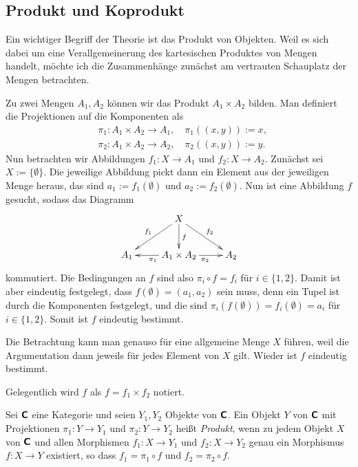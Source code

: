 \subsection{Produkt und Koprodukt}

Ein wichtiger Begriff der Theorie ist das Produkt von
Objekten. Weil es sich dabei um eine Verallgemeinerung des
kartesischen Produktes von Mengen handelt, möchte ich die
Zusammenhänge zunächst am vertrauten Schauplatz der Mengen
betrachten.

Zu zwei Mengen $A_1, A_2$ können wir das Produkt
$A_1\times A_2$ bilden. Man definiert die Projektionen
auf die Komponenten als
\begin{align*}
&\pi_1\colon A_1\times A_2\to A_1,\quad\pi_1((x,y)) := x,\\
&\pi_2\colon A_1\times A_2\to A_2,\quad\pi_2((x,y)) := y.
\end{align*}
Nun betrachten wir Abbildungen $f_1\colon X\to A_1$ und
$f_2\colon X\to A_2$. Zunächst sei $X:=\{\emptyset\}$. Die jeweilige
Abbildung pickt dann ein Element aus der jeweiligen Menge heraus,
das sind $a_1:=f_1(\emptyset)$ und $a_2:=f_2(\emptyset)$. Nun
ist eine Abbildung $f$ gesucht, sodass das Diagramm
\[\xymatrix{
& X\ar[dl]_{f_1}\ar[dr]^{f_2}\ar[d]^f & \\
A_1 & A_1\times A_2 \ar[l]^{\pi_1}\ar[r]_{\pi_2} & A_2
}\]
kommutiert. Die Bedingungen an $f$ sind also
$\pi_i\circ f = f_i$ für $i\in\{1,2\}$. Damit ist aber eindeutig
festgelegt, dass $f(\emptyset)=(a_1,a_2)$ sein muss, denn ein
Tupel ist durch die Komponenten festgelegt, und die sind
$\pi_i(f(\emptyset)) = f_i(\emptyset) = a_i$ für $i\in\{1,2\}$.
Somit ist $f$ eindeutig bestimmt.

Die Betrachtung kann man genauso für eine allgemeine Menge $X$ führen,
weil die Argumentation dann jeweils für jedes Element von $X$ gilt.
Wieder ist $f$ eindeutig bestimmt.

Gelegentlich wird $f$ als $f=f_1\times f_2$ notiert.

\begin{Definition}[Produkt]\newlinefirst
Sei $\textsf{\textbf{C}}$ eine Kategorie und seien $Y_1,Y_2$ Objekte von
$\textsf{\textbf{C}}$. Ein Objekt $Y$ von $\textsf{\textbf{C}}$ mit Projektionen
$\pi_1\colon Y\to Y_1$ und $\pi_2\colon Y\to Y_2$ heißt \emph{Produkt},
wenn zu jedem Objekt $X$ von $\textsf{\textbf{C}}$ und allen Morphismen
$f_1\colon X\to Y_1$ und $f_2\colon X\to Y_2$ genau ein Morphismus
$f\colon X\to Y$ existiert, so dass $f_1=\pi_1\circ f$ und
$f_2=\pi_2\circ f$.
\end{Definition}


